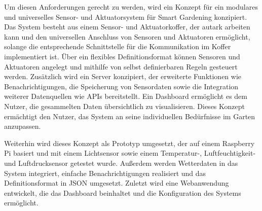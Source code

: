 Um diesen Anforderungen gerecht zu werden, wird ein Konzept für ein modulares und universelles Sensor- und Aktuatorsystem für Smart Gardening konzipiert.
Das System besteht aus einem Sensor- und Aktuatorkoffer, der autark arbeiten kann und den universellen Anschluss von Sensoren und Aktuatoren ermöglicht, solange die entsprechende Schnittstelle für die Kommunikation im Koffer implementiert ist.
Über ein flexibles Definitionsformat können Sensoren und Aktuatoren angelegt und mithilfe von selbst definierbaren Regeln gesteuert werden.
Zusätzlich wird ein Server konzipiert, der erweiterte Funktionen wie Benachrichtigungen, die Speicherung von Sensordaten sowie die Integration weiterer Datenquellen wie APIs bereitstellt.
Ein Dashboard ermöglicht es dem Nutzer, die gesammelten Daten übersichtlich zu visualisieren.
Dieses Konzept ermächtigt den Nutzer, das System an seine individuellen Bedürfnisse im Garten anzupassen.

Weiterhin wird dieses Konzept als Prototyp umgesetzt, der auf einem Raspberry Pi basiert und mit einem Lichtsensor sowie einem Temperatur-, Luftfeuchtigkeit- und Luftdrucksensor getestet wurde.
Außerdem werden Wetterdaten in das System integriert, einfache Benachrichtigungen realisiert und das Definitionsformat in JSON umgesetzt.
Zuletzt wird eine Webanwendung entwickelt, die das Dashboard beinhaltet und die Konfiguration des Systems ermöglicht.

\cleardoublepage
